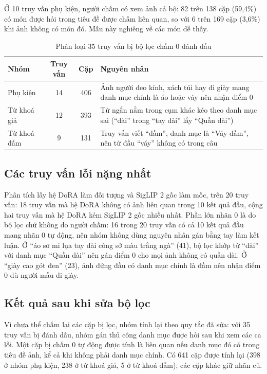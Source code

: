 Ở 10 truy vấn phụ kiện, người chấm có xem ảnh cả bộ: 82 trên 138 cặp (59,4\%) có món được hỏi trong tiêu đề được chấm liên quan, so với 6 trên 169 cặp (3,6\%) khi ảnh không có món đó. Mẫu này nghiêng về các món dễ thấy.

\begin{table}[H]
\centering
\caption{Phân loại 35 truy vấn bị bộ lọc chấm 0 đánh dấu}
\label{tab:phan-loai-loc}
\footnotesize
\renewcommand{\arraystretch}{1.05}
\begin{tabularx}{\textwidth}{@{}l c c >{\raggedright\arraybackslash}X@{}}
\toprule
\textbf{Nhóm} & \textbf{Truy vấn} & \textbf{Cặp} & \textbf{Nguyên nhân} \\
\midrule
Phụ kiện & 14 & 406 & Ảnh người đeo kính, xách túi hay đi giày mang danh mục chính là áo hoặc váy nên nhận điểm 0 \\
Từ khoá giả & 12 & 393 & Từ ngắn nằm trong cụm khác kéo theo danh mục sai (``dài'' trong ``tay dài'' lấy ``Quần dài'') \\
Từ khoá đầm & 9 & 131 & Truy vấn viết ``đầm'', danh mục là ``Váy đầm'', nên từ đầu ``váy'' không có trong câu \\
\bottomrule
\end{tabularx}
\end{table}

\subsection{Các truy vấn lỗi nặng nhất}
\label{sec:hai-muoi-loi}

Phân tích lấy hệ DoRA làm đối tượng và SigLIP 2 gốc làm mốc, trên 20 truy vấn: 18 truy vấn mà hệ DoRA không có ảnh liên quan trong 10 kết quả đầu, cộng hai truy vấn mà hệ DoRA kém SigLIP 2 gốc nhiều nhất. Phần lớn nhãn 0 là do bộ lọc chứ không do người chấm: 16 trong 20 truy vấn có cả 10 kết quả đầu mang nhãn 0 tự động, nên nhóm không dùng nguyên nhân gán bằng tay làm kết luận. Ở ``áo sơ mi lụa tay dài công sở màu trắng ngà'' (41), bộ lọc khớp từ ``dài'' với danh mục ``Quần dài'' nên gán điểm 0 cho mọi ảnh không có quần dài. Ở ``giày cao gót đen'' (23), ảnh đứng đầu có danh mục chính là đầm nên nhận điểm 0 dù người mẫu đi giày.

\subsection{Kết quả sau khi sửa bộ lọc}
\label{sec:sau-sua-loc}

Vì chưa thể chấm lại các cặp bị lọc, nhóm tính lại theo quy tắc đã sửa: với 35 truy vấn bị đánh dấu, nhóm gán thủ công danh mục được hỏi sau khi xem các ca lỗi. Một cặp bị chấm 0 tự động được tính là liên quan nếu danh mục đó có trong tiêu đề ảnh, kể cả khi không phải danh mục chính. Có 641 cặp được tính lại (398 ở nhóm phụ kiện, 238 ở từ khoá giả, 5 ở từ khoá đầm); các cặp khác giữ nhãn cũ.

